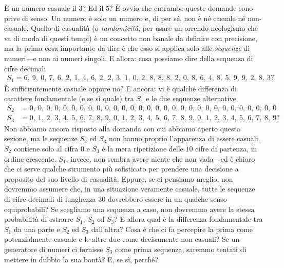 \`E un numero casuale il $3$? Ed il $5$? \`E ovvio che entrambe queste domande
sono prive di senso. Un numero è solo un numero e, di per sé, non è né
casuale né non-casuale. Quello di casualità (o \emph{randomicità}, per
usare un orrendo neologismo che va di moda di questi tempi) è un concetto non
banale da definire con precisione, ma la prima cosa importante da dire è che
esso si applica solo alle \emph{sequenze} di numeri---e non ai numeri singoli.
E allora: cosa possiamo dire della sequenza di cifre decimali
\begin{align*}
  S_1 = 6,~9,~0,~7,~6,~2,~1,~4,~6,~2,~2,~3,~1,~0,~2,~8,~8,~8,~2,~0,~8,~6,~4,~
  8,~5,~9,~9,~2,~8,~3?
\end{align*}
\`E sufficientemente casuale oppure no? E ancora: vi è qualche differenza di
carattere fondamentale (e se sì quale) tra $S_1$ e le due sequenze alternative
\begin{align*}
  S_2 &= 0,~0,~0,~0,~0,~0,~0,~0,~0,~0,~0,~0,~0,~0,~0,~0,~0,~0,~0,~0,~0,~0,~0,~
  0,~0,~0,~0,~0,~0,~0\\
  S_3 &= 0,~1,~2,~3,~4,~5,~6,~7,~8,~9,~0,~1,~2,~3,~4,~5,~6,~7,~8,~9,~0,~1,~2,~
  3,~4,~5,~6,~7,~8,~9?
\end{align*}
Non abbiamo ancora risposto alla domanda con cui abbiamo aperto questa sezione,
ma le sequenze $S_2$ ed $S_3$ non hanno proprio l'apparenza di essere casuali.
$S_2$ contiene solo al cifra $0$ e $S_3$ è la mera ripetizione delle $10$
cifre di partenza, in ordine crescente. $S_1$, invece, non sembra avere niente
che non vada---ed è chiaro che ci serve qualche strumento più sofisticato
per prendere una decisione a proposito del suo livello di casualità.
Eppure, se ci pensiamo meglio, non dovremmo assumere che, in una situazione
veramente casuale, tutte le sequenze di cifre decimali di lunghezza $30$
dovrebbero essere in un qualche senso equiprobabili? Se scegliamo una sequenza
a caso, non dovremmo avere la stessa probabilità di estrarre $S_1$, $S_2$ ed
$S_3$? E allora qual è la differenza fondamentale tra $S_1$ da una parte e
$S_2$ ed $S_3$ dall'altra? Cosa è che ci fa percepire la prima come
potenzialmente casuale e le altre due come decisamente non casuali?
Se un generatore di numeri  ci fornisse $S_3$ come prima
sequenza, saremmo tentati di mettere in dubbio la sua bontà? E, se sì,
perché?

